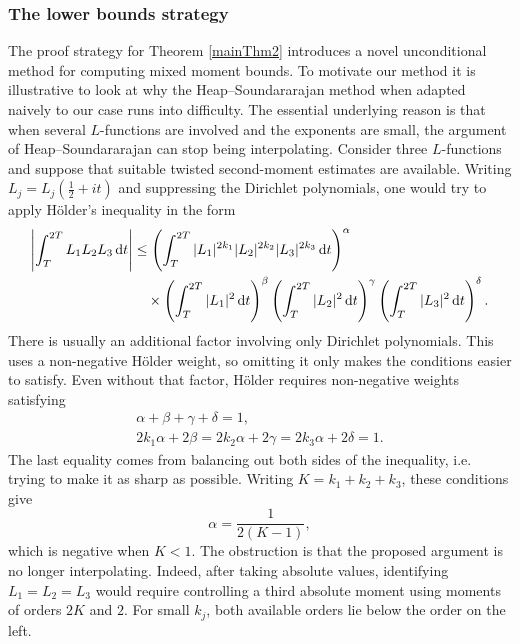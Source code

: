 \documentclass[oneside, 12pt]{amsart}
\theoremstyle{definition}
\newcommand{\dt}{\, \textup{d}t}
\begin{document}
	\subsubsection*{The lower bounds strategy} The proof strategy for Theorem \ref{mainThm2} introduces a novel unconditional method for computing mixed moment bounds. To motivate our method it is illustrative to look at why the Heap--Soundararajan method when adapted naively to our case runs into difficulty. The essential underlying reason is that when several $L$-functions are involved
	and the exponents are small, the argument of Heap--Soundararajan can stop being
	interpolating. Consider three $L$-functions
	and suppose that suitable twisted second-moment estimates
	are available.
	Writing $L_j=L_j(\tfrac12+it)$ and suppressing the Dirichlet polynomials,
	one would try to apply Hölder's inequality in the form
	\[
	\begin{aligned}
		\left|\int_T^{2T}L_1L_2L_3\dt\right|
		&\leq
		\left(\int_T^{2T}
		|L_1|^{2k_1}|L_2|^{2k_2}|L_3|^{2k_3}\dt\right)^\alpha\\
		&\quad{}\times
		\left(\int_T^{2T}|L_1|^2\dt\right)^\beta
		\left(\int_T^{2T}|L_2|^2\dt\right)^\gamma
		\left(\int_T^{2T}|L_3|^2\dt\right)^\delta.
	\end{aligned}
	\]
	There is usually an additional factor involving only Dirichlet
	polynomials. This uses a non-negative Hölder weight, so omitting it
	only makes the conditions easier to satisfy. Even without that factor,
	Hölder requires non-negative weights satisfying
	\[
	\begin{gathered}
		\alpha+\beta+\gamma+\delta=1,\\
		2k_1\alpha+2\beta
		=2k_2\alpha+2\gamma
		=2k_3\alpha+2\delta=1.
	\end{gathered}
	\]
	The last equality comes from balancing out both sides of the inequality, i.e. trying to make it as sharp as possible. Writing $K=k_1+k_2+k_3$, these conditions give
	\[
	\alpha=\frac{1}{2(K-1)},
	\]
	which is negative when $K<1$. The obstruction is that the proposed
	argument is no longer interpolating. Indeed, after taking absolute
	values, identifying $L_1=L_2=L_3$ would require controlling a third
	absolute moment using moments of orders $2K$ and $2$. For small $k_j$,
	both available orders lie below the order on the left.
	
\end{document}
